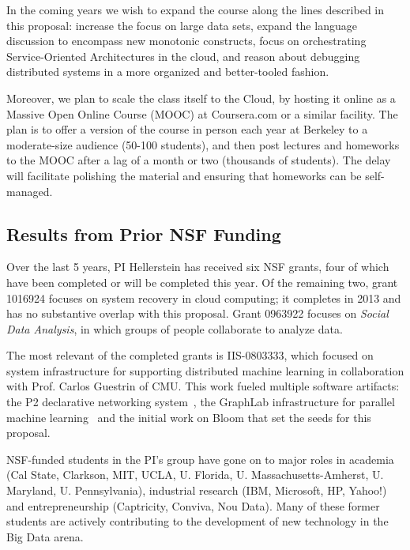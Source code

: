 In the coming years we wish to expand the course along the lines described in this proposal: increase the focus on large data sets, expand the language discussion to encompass new monotonic constructs, focus on orchestrating Service-Oriented Architectures in the cloud, and reason about debugging distributed systems in a more organized and better-tooled fashion.  

Moreover, we plan to scale the class itself to the Cloud, by hosting it online as a Massive Open Online Course (MOOC) at Coursera.com or a similar facility.  The plan is to offer a version of the course in person each year at Berkeley to a moderate-size audience (50-100 students), and then post lectures and homeworks to the MOOC after a lag of a month or two (thousands of students). The delay will facilitate polishing the material and ensuring that homeworks can be self-managed.

\subsection{Results from Prior NSF Funding}
\label{sec:prior}

Over the last 5 years, PI Hellerstein has received six NSF grants, four of which have been completed or will be completed this year.  Of the remaining two, grant 1016924 focuses on system recovery in cloud computing; it
completes in 2013 and has no substantive overlap with this
proposal. Grant 0963922 focuses on \emph{Social Data Analysis}, in which groups of people collaborate to analyze data. 

The most relevant of the completed grants is IIS-0803333, which focused on system infrastructure for supporting distributed machine learning in collaboration with Prof. Carlos Guestrin of CMU.  This work fueled multiple software artifacts: the P2 declarative networking system~\cite{p2}, the GraphLab infrastructure for parallel machine learning~\cite{uaigraphlab} and the initial work on Bloom that set the seeds for this proposal.  

NSF-funded students in the PI's group have gone on to major roles in academia (Cal State, Clarkson, MIT, UCLA, U. Florida, U. Massachusetts-Amherst, U. Maryland, U. Pennsylvania), industrial research (IBM, Microsoft, HP, Yahoo!) and entrepreneurship (Captricity, Conviva, Nou Data).  Many of these former students are actively contributing to the development of new technology in the Big Data arena.

